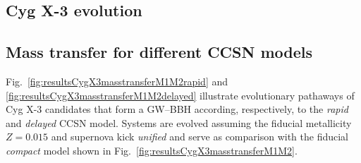 \documentclass[a4paper,titlepage]{book}     	%
\begin{document}
\begin{appendices}
\section{Cyg X-3 evolution}
\subsection{Mass transfer for different CCSN models}
Fig.\ \ref{fig:resultsCygX3masstransferM1M2rapid} and \ref{fig:resultsCygX3masstransferM1M2delayed} illustrate evolutionary pathaways of Cyg X-3 candidates that form a GW--BBH according, respectively, to the \emph{rapid} and \emph{delayed} CCSN model. Systems are evolved assuming the fiducial metallicity $Z=0.015$ and supernova kick \emph{unified} and serve as comparison with the fiducial \emph{compact} model shown in Fig.\ \ref{fig:resultsCygX3masstransferM1M2}.


\end{appendices}
\end{document}
